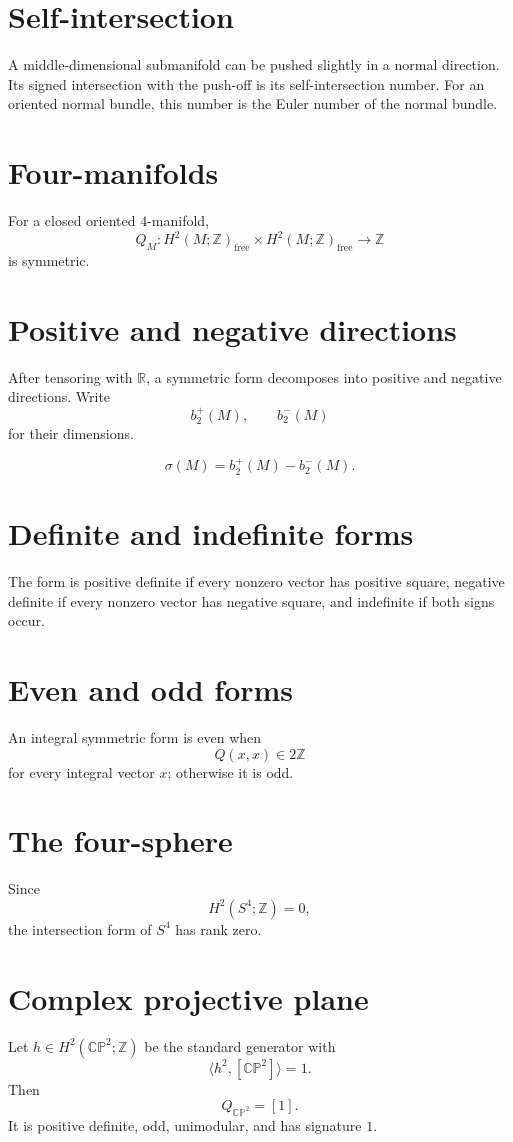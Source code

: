 \section{Self-intersection}
A middle-dimensional submanifold can be pushed slightly in a normal direction.
Its signed intersection with the push-off is its self-intersection number.
For an oriented normal bundle, this number is the Euler number of the normal
bundle.

\section{Four-manifolds}
For a closed oriented $4$-manifold,
\[
Q_M:H^2(M;\mathbb Z)_{\mathrm{free}}\times
H^2(M;\mathbb Z)_{\mathrm{free}}\to\mathbb Z
\]
is symmetric.

\section{Positive and negative directions}
After tensoring with $\mathbb R$, a symmetric form decomposes into positive
and negative directions.  Write
\[
b_2^+(M),\qquad b_2^-(M)
\]
for their dimensions.

\begin{definition}[Signature]
\label{def:viii34-signature}
\[
\sigma(M)=b_2^+(M)-b_2^-(M).
\]
\end{definition}

\section{Definite and indefinite forms}
The form is positive definite if every nonzero vector has positive square,
negative definite if every nonzero vector has negative square, and indefinite
if both signs occur.

\section{Even and odd forms}
An integral symmetric form is even when
\[
Q(x,x)\in2\mathbb Z
\]
for every integral vector $x$; otherwise it is odd.

\section{The four-sphere}
Since
\[
H^2(S^4;\mathbb Z)=0,
\]
the intersection form of $S^4$ has rank zero.

\section{Complex projective plane}
Let $h\in H^2(\mathbb{CP}^2;\mathbb Z)$ be the standard generator with
\[
\langle h^2,[\mathbb{CP}^2]\rangle=1.
\]
Then
\[
Q_{\mathbb{CP}^2}=[1].
\]
It is positive definite, odd, unimodular, and has signature $1$.

